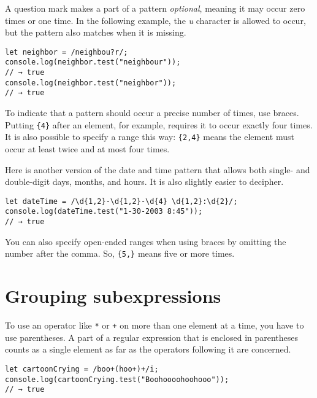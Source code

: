 A question mark makes a part of a pattern \emph{optional}, meaning it may occur zero times or one time. In the following example, the \emph{u} character is allowed to occur, but the pattern also matches when it is missing.

\begin{lstlisting}
let neighbor = /neighbou?r/;
console.log(neighbor.test("neighbour"));
// → true
console.log(neighbor.test("neighbor"));
// → true
\end{lstlisting}
\noindent{}

To indicate that a pattern should occur a precise number of times, use braces. Putting \lstinline`{4}` after an element, for example, requires it to occur exactly four times. It is also possible to specify a range this way: \lstinline`{2,4}` means the element must occur at least twice and at most four times.

\label{regexp.date_regexp_counted}Here is another version of the date and time pattern that allows both single- and double-digit days, months, and hours. It is also slightly easier to decipher.

\begin{lstlisting}
let dateTime = /\d{1,2}-\d{1,2}-\d{4} \d{1,2}:\d{2}/;
console.log(dateTime.test("1-30-2003 8:45"));
// → true
\end{lstlisting}
\noindent

You can also specify open-ended ranges when using braces by omitting the number after the comma. So, \lstinline`{5,}` means five or more times.

\section{Grouping subexpressions}

To use an operator like \lstinline`*` or \lstinline`+` on more than one element at a time, you have to use parentheses. A part of a regular expression that is enclosed in parentheses counts as a single element as far as the operators following it are concerned.

\begin{lstlisting}
let cartoonCrying = /boo+(hoo+)+/i;
console.log(cartoonCrying.test("Boohoooohoohooo"));
// → true
\end{lstlisting}
\noindent{}

